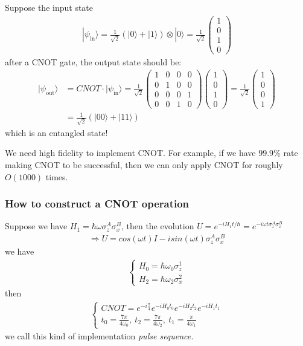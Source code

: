 \documentclass[UTF8,12pt]{article} %
\begin{document}
Suppose the input state
\begin{align}
|\psi_{\text{in}}\rangle = \frac{1}{\sqrt{2}}(|0\rangle + |1\rangle)\otimes|0\rangle = \frac{1}{\sqrt{2}}\begin{pmatrix}1\\0\\1\\0\end{pmatrix}
\end{align}
after a CNOT gate, the output state should be:
\begin{align}
|\psi_{\text{out}}\rangle &= CNOT\cdot|\psi_{\text{in}}\rangle = \frac{1}{\sqrt{2}}\begin{pmatrix}1&0&0&0\\0&1&0&0\\0&0&0&1\\0&0&1&0\end{pmatrix}\begin{pmatrix}1\\0\\1\\0\end{pmatrix} = \frac{1}{\sqrt{2}}\begin{pmatrix}1\\0\\0\\1\end{pmatrix} \\
&= \frac{1}{\sqrt{2}}(|00\rangle + |11\rangle)
\end{align}
which is an entangled state!

We need high fidelity to implement CNOT. For example, if we have $99.9\%$ rate making CNOT to be successful, then we can only apply CNOT for roughly $O(1000)$ times.

\subsubsection{How to construct a CNOT operation}
Suppose we have $H_1 =\hbar\omega\sigma_z^A\sigma_x^B$, then the evolution $U = e^{-iH_{1}t/\hbar} = e^{-i\omega t\sigma_{z}^{A}\sigma_{x}^{B}}$
\begin{align}
\Rightarrow U = cos(\omega t)I - isin(\omega t)\sigma_{z}^{A}\sigma_{x}^{B}
\end{align}
we have
\begin{align}
\begin{cases}H_{0} = \hbar\omega_{0}\sigma_{z}^{1}\\H_{2} = \hbar\omega_{2}\sigma_{x}^{2}\end{cases}
\end{align}
then
\begin{align}
\begin{cases}CNOT = e^{-i\frac{\pi}{4}} e^{-iH_{0}t_{0}} e^{-iH_{2}t_{2}} e^{-iH_{1}t_{1}} \\t_{0} = \frac{7\pi}{4\omega_{0}},~t_{2} = \frac{7\pi}{4\omega_{2}},~t_{1} = \frac{\pi}{4\omega_{1}}\end{cases}
\end{align}
we call this kind of implementation \it{pulse sequence}.
\end{document}
